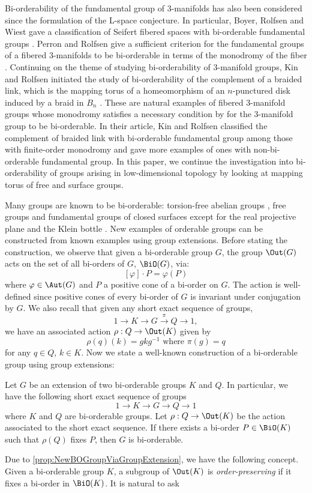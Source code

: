 \documentclass{amsart}
\begin{document}
Bi-orderability of the fundamental group of 3-manifolds has also been considered since the formulation of the L-space conjecture. In particular, Boyer, Rolfsen and Wiest gave a classification of Seifert fibered spaces with bi-orderable fundamental groups \cite{BoyerRolfsenWiest05}. Perron and Rolfsen give a sufficient criterion for the fundamental groups of a fibered 3-manifolds to be bi-orderable in terms of the monodromy of the fiber \cite{PerronRolfsen06, PerronRolfsen03}. Continuing on the theme of studying bi-orderability of 3-manifold groups, Kin and Rolfsen initiated the study of bi-orderability of the complement of a braided link, which is the mapping torus of a homeomorphism of an $n$-punctured disk induced by a braid in $B_n$ \cite{KinRolfsen18}. These are natural examples of fibered 3-manifold groups whose monodromy satisfies a necessary condition by \cite{ClayRolfsen12} for the 3-manifold group to be bi-orderable. In their article, Kin and Rolfsen classified the complement of braided link with bi-orderable fundamental group among those with finite-order monodromy \cite[Theorem 4.10]{KinRolfsen18} and gave more examples of ones with non-bi-orderable fundamental group. In this paper, we continue the investigation into bi-orderability of groups arising in low-dimensional topology by looking at mapping torus of free and surface groups.

Many groups are known to be bi-orderable: torsion-free abelian groups \cite{Levi42}, free groups \cite{Magnus35} and fundamental groups of closed surfaces except for the real projective plane and the Klein bottle \cite{RolfsenWiest01}.
New examples of orderable groups can be constructed from known examples using group extensions. Before stating the construction, we observe that given a bi-orderable group $G$, the group $\Out(G)$ acts on the set of all bi-orders of $G$, $\BiO(G)$, via:
\[
[\varphi]\cdot P = \varphi(P)
\]
where $\varphi \in \Aut(G)$ and $P$ a positive cone of a bi-order on $G$. The action is well-defined since positive cones of every bi-order of $G$ is invariant under conjugation by $G$. We also recall that given any short exact sequence of groups,
\[
1 \to K \to G \xrightarrow{\pi} Q \to 1,
\]
we have an associated action $\rho:Q \to \Out(K)$ given by 
\[
\rho(q)(k) = gkg^{-1} \text{ where } \pi(g) = q
\]
for any $q \in Q$, $k\in K$. Now we state a well-known construction of a bi-orderable group using group extensions:

\begin{prop}\label{prop:NewBOGroupViaGroupExtension}
Let $G$ be an extension of two bi-orderable groups $K$ and $Q$. In particular, we have the following short exact sequence of groups
\[
1 \to K \to G \to Q \to 1
\]
where $K$ and $Q$ are bi-orderable groups. Let $\rho:Q \to \Out(K)$ be the action associated to the short exact sequence. If there exists a bi-order $P \in \BiO(K)$ such that $\rho(Q)$ fixes $P$, then $G$ is bi-orderable. 
\end{prop} 
Due to \cref{prop:NewBOGroupViaGroupExtension}, we have the following concept. Given a bi-orderable group $K$, a subgroup of $\Out(K)$ is \emph{order-preserving} if it fixes a bi-order in $\BiO(K)$. It is natural to ask
\end{document}
